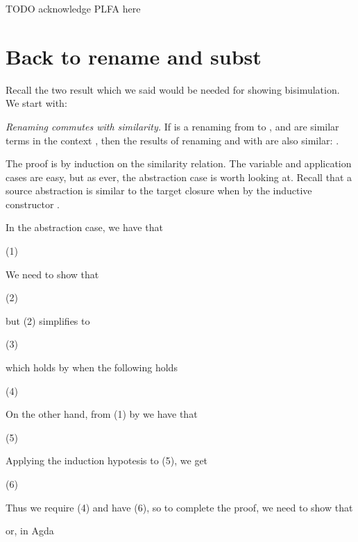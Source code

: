 \documentclass[bsc,frontabs,oneside,singlespacing,parskip,deptreport]{infthesis}
\theoremstyle{definition}
\begin{document}
TODO acknowledge PLFA here


\section{Back to \ti rename and \ti subst}

Recall the two result which we said would be needed for showing
bisimulation. We start with:

\textit{Renaming commutes with similarity.} If  is a renaming from
 to , and  are similar terms in the context
, then the results of renaming  and  with 
are also similar: .


The proof is by induction on the similarity relation. The variable and
application cases are easy, but as ever, the abstraction case is worth
looking at. Recall that a source abstraction is similar to the target
closure  when 
by the inductive constructor .

In the abstraction case, we have that

 (1)

We need to show that

 (2)

but (2) simplifies to

 (3)

which holds by  when the following holds

 (4)

On the other hand, from (1) by  we have that

 (5)

Applying the induction hypotesis to (5), we get

 (6)

Thus we require (4) and have (6), so to complete the proof, we need to
show that 


or, in Agda

\end{document}
